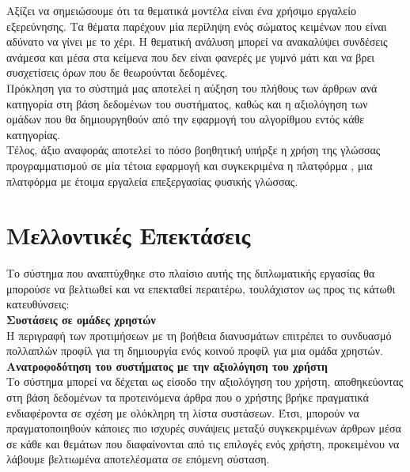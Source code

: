 Αξίζει να σημειώσουμε ότι τα θεματικά μοντέλα είναι ένα χρήσιμο εργαλείο εξερεύνησης. 
Τα θέματα παρέχουν μία περίληψη ενός σώματος κειμένων που είναι αδύνατο να γίνει με το χέρι. Η θεματική
ανάλυση μπορεί να ανακαλύψει συνδέσεις ανάμεσα και μέσα στα κείμενα που δεν είναι
φανερές με γυμνό μάτι και να βρει συσχετίσεις όρων που δε θεωρούνται δεδομένες. \\

Πρόκληση για το σύστημά μας αποτελεί η αύξηση του πλήθους των άρθρων ανά κατηγορία στη βάση δεδομένων του συστήματος, 
καθώς και η αξιολόγηση των ομάδων που θα δημιουργηθούν από την εφαρμογή του αλγορίθμου {} εντός κάθε κατηγορίας. \\

Τέλος, άξιο αναφοράς αποτελεί το πόσο βοηθητική υπήρξε η χρήση της 
γλώσσας προγραμματισμού {} σε μία τέτοια εφαρμογή 
και συγκεκριμένα η πλατφόρμα {}, 
μια πλατφόρμα με έτοιμα εργαλεία επεξεργασίας φυσικής γλώσσας. 

\section{Μελλοντικές Επεκτάσεις}

Το σύστημα που αναπτύχθηκε στο πλαίσιο αυτής της διπλωματικής
εργασίας θα μπορούσε να βελτιωθεί και να επεκταθεί περαιτέρω,
τουλάχιστον ως προς τις κάτωθι κατευθύνσεις: \\

{\textbf {Συστάσεις σε ομάδες χρηστών}}\\
Η περιγραφή των προτιμήσεων με τη βοήθεια διανυσμάτων επιτρέπει το συνδυασμό
πολλαπλών προφίλ για τη δημιουργία ενός κοινού προφίλ για μια ομάδα χρηστών. \\

{\textbf {Ανατροφοδότηση του συστήματος με την αξιολόγηση του χρήστη}} \\
Το σύστημα μπορεί να δέχεται ως είσοδο την αξιολόγηση του χρήστη, 
αποθηκεύοντας στη βάση δεδομένων τα προτεινόμενα άρθρα που ο χρήστης βρήκε 
πραγματικά ενδιαφέροντα σε σχέση με ολόκληρη τη λίστα συστάσεων. 
Έτσι, μπορούν να πραγματοποιηθούν κάποιες πιο ισχυρές συνάψεις μεταξύ 
συγκεκριμένων άρθρων μέσα σε κάθε {} και θεμάτων που 
διαφαίνονται από τις επιλογές ενός χρήστη, προκειμένου να λάβουμε βελτιωμένα αποτελέσματα 
σε επόμενη σύσταση. \\

